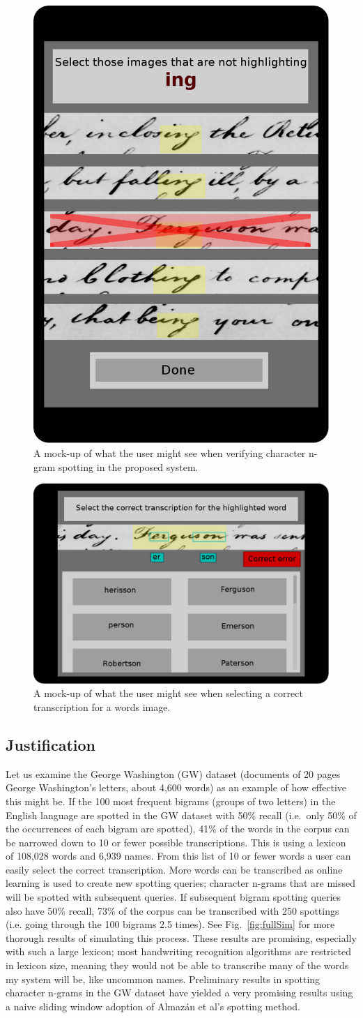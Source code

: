 \documentclass[conference]{IEEEtran}
\begin{document}
{\begin{figure}
    \centering
    \includegraphics[width=.25\textwidth]{userTask_spot}
    \caption{A mock-up of what the user might see when verifying character n-gram spotting in the proposed system.}
    \label{fig:userTask_spot}
\end{figure}

\begin{figure}
    \centering
    \includegraphics[width=.35\textwidth]{userTask_trans}
    \caption{A mock-up of what the user might see when selecting a correct transcription for a words image.}
    \label{fig:userTask_trans}
\end{figure}

\subsection{Justification}


Let us examine the George Washington (GW) dataset\cite{GW} (documents of 20 pages George Washington's letters, about 4,600 words) as an example of how effective this might be. If the 100 most frequent bigrams (groups of two letters) in the English language are spotted in the GW dataset with 50\% recall (i.e.~only 50\% of the occurrences of each bigram are spotted), 41\% of the words in the corpus can be narrowed down to 10 or fewer possible transcriptions. This is using a lexicon of 108,028 words and 6,939 names. From this list of 10 or fewer words a user can easily select the correct transcription. More words can be transcribed as online learning is used to create new spotting queries; character n-grams that are missed will be spotted with subsequent queries. If subsequent bigram spotting queries also have 50\% recall, 73\% of the corpus can be transcribed with 250 spottings (i.e. going through the 100 bigrams 2.5 times). See Fig.~\ref{fig:fullSim} for more thorough results of simulating this process. These results are promising, especially with such a large lexicon; most handwriting recognition algorithms are restricted in lexicon size, meaning they would not be able to transcribe many of the words my system will be, like uncommon names.  Preliminary results in spotting character n-grams in the GW dataset have yielded a very promising results using a naive sliding window adoption of Almaz\'{a}n et al's\cite{Almazan2014} spotting method.

}
\end{document}
